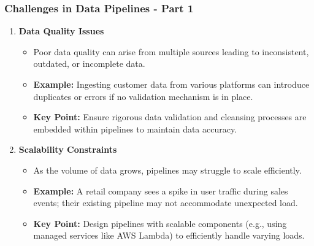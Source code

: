 \documentclass[aspectratio=169]{beamer}
\begin{document}
\begin{frame}[fragile]
  \frametitle{Challenges in Data Pipelines - Part 1}
  \begin{enumerate}
    \item \textbf{Data Quality Issues}
      \begin{itemize}
        \item Poor data quality can arise from multiple sources leading to inconsistent, outdated, or incomplete data.
        \item \textbf{Example:} Ingesting customer data from various platforms can introduce duplicates or errors if no validation mechanism is in place.
        \item \textbf{Key Point:} Ensure rigorous data validation and cleansing processes are embedded within pipelines to maintain data accuracy.
      \end{itemize}
      
    \item \textbf{Scalability Constraints}
      \begin{itemize}
        \item As the volume of data grows, pipelines may struggle to scale efficiently.
        \item \textbf{Example:} A retail company sees a spike in user traffic during sales events; their existing pipeline may not accommodate unexpected load.
        \item \textbf{Key Point:} Design pipelines with scalable components (e.g., using managed services like AWS Lambda) to efficiently handle varying loads.
      \end{itemize}
  \end{enumerate}
\end{frame}
\end{document}
